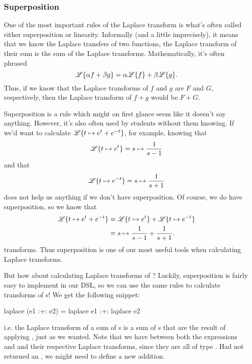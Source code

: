 \subsubsection{Superposition}
One of the most important rules of the Laplace transform is what's often called
either superposition or linearity. Informally (and a little imprecisely), it means that we know the
Laplace transfers of two functions, the Laplace transform of their sum is the
sum of the Laplace transforms. Mathematically, it's often phrased
\begin{equation*}
 \mathscr{L} \{\alpha f + \beta g\} = \alpha \mathscr{L} \{f\} + \beta \mathscr{L} \{g\}.
\end{equation*}
Thus, if we know that the Laplace transforms of $f$ and $g$ are $F$ and $G$,
respectively, then the Laplace transform of $f + g$ would be $F + G$.

Superposition is a rule which might on first glance seem like it doesn't say
anything. However, it's also often used by students without them knowing.
If we'd want to calculate $\mathscr{L}\{t \mapsto e^{t} + e^{-t}\}$, for example,
knowing that 
\begin{equation*}
  \mathscr{L}\{t \mapsto e^{t}\}  = s \mapsto \frac{1}{s-1}
  \end{equation*}
and that 
  \begin{equation*}
  \mathscr{L}\{t \mapsto e^{-t}\} = s \mapsto \frac{1}{s+1}
\end{equation*}
does not help us anything if we don't have superposition.
Of course, we do have superposition, so we know that
\begin{align*}
  \mathscr{L}\{t \mapsto e^{t}+e^{-t}\} &= \mathscr{L}\{ t \mapsto e^t \} + \mathscr{L}\{t \mapsto e^{-t}\} \\
                                &= s \mapsto \frac{1}{s-1}   + \frac{1}{s+1}.
\end{align*}
transforms. 
Thus superposition is one of our most useful tools when calculating Laplace
transforms. 

But how about calculating Laplace transforms of ? 
Luckily, superposition is fairly easy to implement in our DSL, so we can use the
same rules to calculate transforms of s!
We get the following snippet: 
\begin{code}
laplace (e1 :+: e2) = laplace e1 :+: laplace e2 
\end{code}
i.e. the Laplace transform of a sum of s is a sum of
s that are the result of applying , just as we
wanted. 
Note that we have \cmd{:+:} between both the expressions  and 
and their respective Laplace transforms, since they are all of type
. Had  not returned an , we might
need to define a new addition. 


